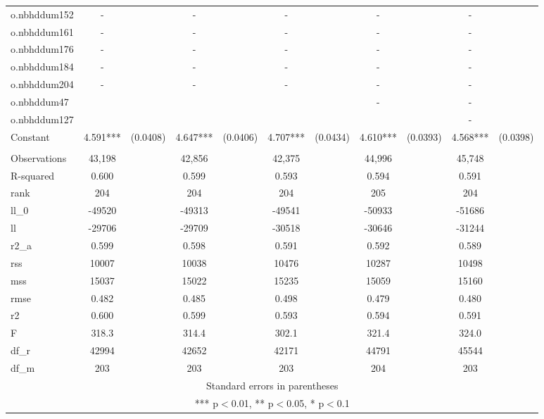 \documentclass[]{article}
\begin{document}
\begin{tabular}{lcccccccccc}
o.nbhddum152 & - &  & - &  & - &  & - &  & - &  \\
o.nbhddum161 & - &  & - &  & - &  & - &  & - &  \\
o.nbhddum176 & - &  & - &  & - &  & - &  & - &  \\
o.nbhddum184 & - &  & - &  & - &  & - &  & - &  \\
o.nbhddum204 & - &  & - &  & - &  & - &  & - &  \\
o.nbhddum47 &  &  &  &  &  &  & - &  & - &  \\
o.nbhddum127 &  &  &  &  &  &  &  &  & - &  \\
Constant & 4.591*** & (0.0408) & 4.647*** & (0.0406) & 4.707*** & (0.0434) & 4.610*** & (0.0393) & 4.568*** & (0.0398) \\
 &  &  &  &  &  &  &  &  &  &  \\
Observations & 43,198 &  & 42,856 &  & 42,375 &  & 44,996 &  & 45,748 &  \\
R-squared & 0.600 &  & 0.599 &  & 0.593 &  & 0.594 &  & 0.591 &  \\
rank & 204 &  & 204 &  & 204 &  & 205 &  & 204 &  \\
ll\_0 & -49520 &  & -49313 &  & -49541 &  & -50933 &  & -51686 &  \\
ll & -29706 &  & -29709 &  & -30518 &  & -30646 &  & -31244 &  \\
r2\_a & 0.599 &  & 0.598 &  & 0.591 &  & 0.592 &  & 0.589 &  \\
rss & 10007 &  & 10038 &  & 10476 &  & 10287 &  & 10498 &  \\
mss & 15037 &  & 15022 &  & 15235 &  & 15059 &  & 15160 &  \\
rmse & 0.482 &  & 0.485 &  & 0.498 &  & 0.479 &  & 0.480 &  \\
r2 & 0.600 &  & 0.599 &  & 0.593 &  & 0.594 &  & 0.591 &  \\
F & 318.3 &  & 314.4 &  & 302.1 &  & 321.4 &  & 324.0 &  \\
df\_r & 42994 &  & 42652 &  & 42171 &  & 44791 &  & 45544 &  \\
 df\_m & 203 &  & 203 &  & 203 &  & 204 &  & 203 &  \\ \hline
\multicolumn{11}{c}{ Standard errors in parentheses} \\
\multicolumn{11}{c}{ *** p$<$0.01, ** p$<$0.05, * p$<$0.1} \\
\end{tabular}
\end{document}
